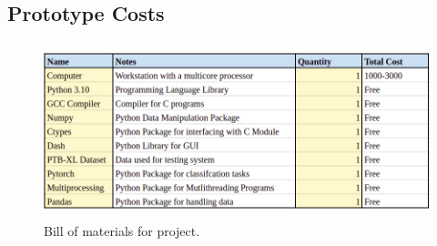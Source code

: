 \documentclass{article}
\begin{document}
\newpage
\subsection{Prototype Costs}

\begin{figure}[h]
    \centering
    \includegraphics[width=5in, height=2in]{BOM.png}
    \caption{Bill of materials for project.}
\end{figure}
\end{document}
